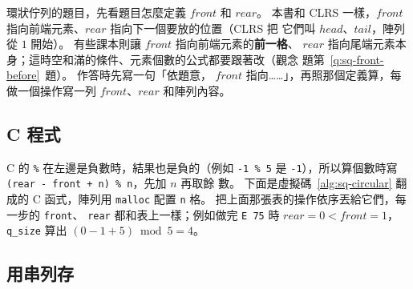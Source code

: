 \begin{examnote}
環狀佇列的題目，先看題目怎麼定義 $\mathit{front}$ 和 $\mathit{rear}$。 本書和 CLRS
一樣，$\mathit{front}$ 指向前端元素、$\mathit{rear}$ 指向下一個要放的位置（CLRS 把
它們叫 $\mathit{head}$、$\mathit{tail}$，陣列從 $1$ 開始）。 有些課本則讓 $\mathit{front}$ 指向前端元素的\textbf{前一格}、
$\mathit{rear}$ 指向尾端元素本身；這時空和滿的條件、元素個數的公式都要跟著改（觀念
題第~\ref{q:sq-front-before}~題）。 作答時先寫一句「依題意，
$\mathit{front}$ 指向……」，再照那個定義算，每做一個操作寫一列
$\mathit{front}$、$\mathit{rear}$ 和陣列內容。
\end{examnote}

\subsection{C 程式}

C 的 \texttt{\%} 在左邊是負數時，結果也是負的（例如 \texttt{-1 \% 5} 是
\texttt{-1}），所以算個數時寫 \texttt{(rear - front + n) \% n}，先加 $n$ 再取餘
數。 下面是虛擬碼~\ref{alg:sq-circular} 翻成的 C 函式，陣列用 \texttt{malloc}
配置 \texttt{n} 格。 把上面那張表的操作依序丟給它們，每一步的 \texttt{front}、
\texttt{rear} 都和表上一樣；例如做完 \texttt{E 75} 時 $\mathit{rear} = 0 <
\mathit{front} = 1$，\texttt{q\_size} 算出 $(0 - 1 + 5) \bmod 5 = 4$。


\subsection{用串列存}

